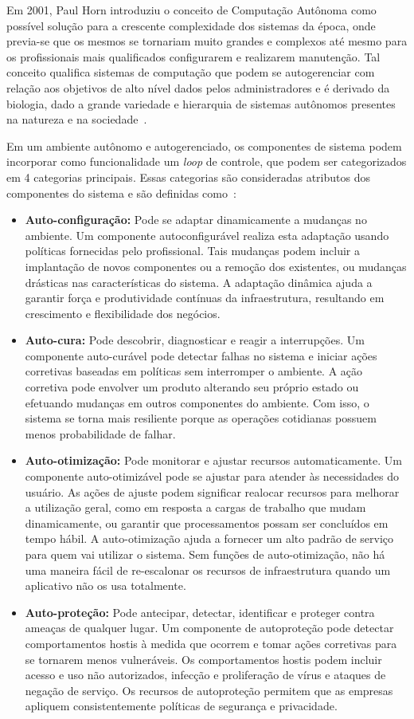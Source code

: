 \documentclass[portugues]{ic-tese}
\begin{document}
Em 2001, Paul Horn introduziu o conceito de Computação Autônoma como possível solução para a crescente complexidade dos sistemas da época, onde previa-se que os mesmos se tornariam muito grandes e complexos até mesmo para os profissionais mais qualificados configurarem e realizarem manutenção. Tal conceito qualifica sistemas de computação que podem se autogerenciar com relação aos objetivos de alto nível dados pelos administradores e é derivado da biologia, dado a grande variedade e hierarquia de sistemas autônomos presentes na natureza e na sociedade~\citep{Kephart_2003}. 

Em um ambiente autônomo e autogerenciado, os componentes de sistema podem incorporar como funcionalidade um \textit{loop} de controle, que podem ser categorizados em 4 categorias principais. Essas categorias são consideradas atributos dos componentes do sistema e são definidas como~\citep{IBM_2005}:

\begin{itemize}
\item \textbf{Auto-configuração:} Pode se adaptar dinamicamente a mudanças no ambiente. Um componente autoconfigurável realiza esta adaptação usando políticas fornecidas pelo profissional. Tais mudanças podem incluir a implantação de novos componentes ou a remoção dos existentes, ou mudanças drásticas nas características do sistema. A adaptação dinâmica ajuda a garantir força e produtividade contínuas da infraestrutura, resultando em crescimento e flexibilidade dos negócios.
\item \textbf{Auto-cura:} Pode descobrir, diagnosticar e reagir a interrupções. Um componente auto-curável pode detectar falhas no sistema e iniciar ações corretivas baseadas em políticas sem interromper o ambiente. A ação corretiva pode envolver um produto alterando seu próprio estado ou efetuando mudanças em outros componentes do ambiente. Com isso, o sistema se torna mais resiliente porque as operações cotidianas possuem menos probabilidade de falhar.
\item \textbf{Auto-otimização:} Pode monitorar e ajustar recursos automaticamente. Um componente auto-otimizável pode se ajustar para atender às necessidades do usuário. As ações de ajuste podem significar realocar recursos para melhorar a utilização geral, como em resposta a cargas de trabalho que mudam dinamicamente, ou garantir que processamentos possam ser concluídos em tempo hábil. A auto-otimização ajuda a fornecer um alto padrão de serviço para quem vai utilizar o sistema. Sem funções de auto-otimização, não há uma maneira fácil de re-escalonar os recursos de infraestrutura quando um aplicativo não os usa totalmente.
\item \textbf{Auto-proteção:} Pode antecipar, detectar, identificar e proteger contra ameaças de qualquer lugar. Um componente de autoproteção pode detectar comportamentos hostis à medida que ocorrem e tomar ações corretivas para se tornarem menos vulneráveis. Os comportamentos hostis podem incluir acesso e uso não autorizados, infecção e proliferação de vírus e ataques de negação de serviço. Os recursos de autoproteção permitem que as empresas apliquem consistentemente políticas de segurança e privacidade.
\end{itemize}
\end{document}

